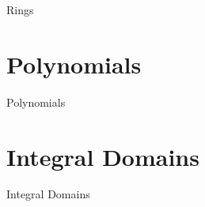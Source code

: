 Rings

\section{Polynomials}
\label{sec:polynomials}

Polynomials

\section{Integral Domains}
\label{sec:integral-domains}

Integral Domains
